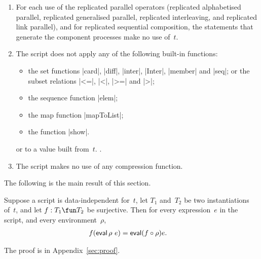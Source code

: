 \begin{definition}
\begin{enumerate}
\item\label{item:indexing} For each use of the replicated parallel operators
  (replicated alphabetised parallel, replicated generalised parallel,
  replicated interleaving, and replicated link parallel), and for replicated
  sequential composition, the statements that generate the component processes
  make no use of~$t$. 


\item\label{item:built-in-functions} The script does not apply any of the
  following built-in functions:
  \begin{itemize}
    \item the set functions |card|, |diff|, |inter|, |Inter|, |member| and
      |seq|; or the subset relations |<=|, |<|, |>=| and |>|;

    \item the sequence function |elem|;

    \item the map function |mapToList|;

    \item the function |show|.
  \end{itemize}
   or  to a value built from~$t$.
  . 

\item The script makes no use of any compression function.
\end{enumerate}
\end{definition}


The following is the main result of this section.
%
\begin{prop}
\label{prop:expressions}
Suppose a script is data-independent for~$t$, let $T_1$ and~$T_2$ be two
instantiations of~$t$, and let $f : T_1 \fun T_2$ be surjective.  Then for
every expression~$e$ in the script, and every environment~$\rho$,
\begin{eqnarray*}
f(\mathop{\sf eval} \rho ~ e) & = \mathop{\sf eval} (f \circ \rho) e .
\end{eqnarray*}
\end{prop}
%
The proof is in Appendix~\ref{sec:proof}.

